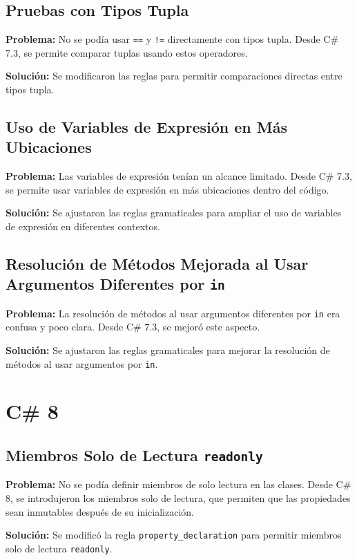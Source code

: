 \subsection*{Pruebas con Tipos Tupla}
\textbf{Problema:} No se podía usar \texttt{==} y \texttt{!=} directamente con tipos tupla. Desde C\# 7.3, se permite comparar tuplas usando estos operadores.

\textbf{Solución:} Se modificaron las reglas para permitir comparaciones directas entre tipos tupla.

\subsection*{Uso de Variables de Expresión en Más Ubicaciones}
\textbf{Problema:} Las variables de expresión tenían un alcance limitado. Desde C\# 7.3, se permite usar variables de expresión en más ubicaciones dentro del código.

\textbf{Solución:} Se ajustaron las reglas gramaticales para ampliar el uso de variables de expresión en diferentes contextos.

\subsection*{Resolución de Métodos Mejorada al Usar Argumentos Diferentes por \texttt{in}}
\textbf{Problema:} La resolución de métodos al usar argumentos diferentes por \texttt{in} era confusa y poco clara. Desde C\# 7.3, se mejoró este aspecto.

\textbf{Solución:} Se ajustaron las reglas gramaticales para mejorar la resolución de métodos al usar argumentos por \texttt{in}.

\section*{C\# 8}

\subsection*{Miembros Solo de Lectura \texttt{readonly}}
\textbf{Problema:} No se podía definir miembros de solo lectura en las clases. Desde C\# 8, se introdujeron los miembros solo de lectura, que permiten que las propiedades sean inmutables después de su inicialización.

\textbf{Solución:} Se modificó la regla \texttt{property\_declaration} para permitir miembros solo de lectura \texttt{readonly}.

